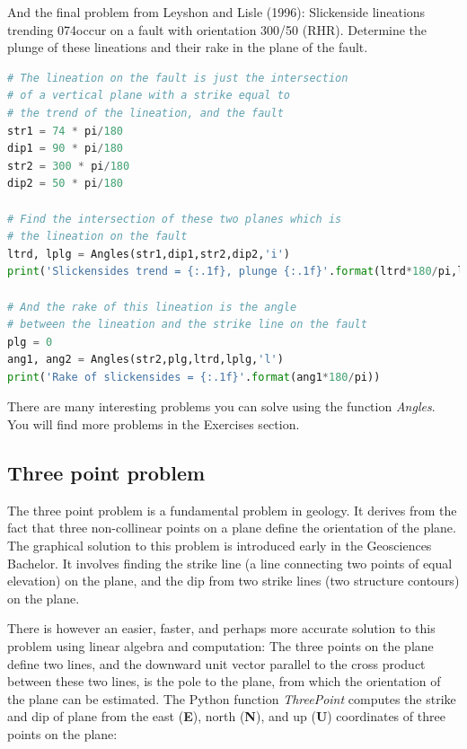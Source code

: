 \documentclass[a4paper , 12pt]{book}
\begin{document}
And the final problem from Leyshon and Lisle (1996): Slickenside lineations trending 074\degree occur on a fault with orientation 300/50 (RHR). Determine the plunge of these lineations and their rake in the plane of the fault.

\begin{center}
\begin{lstlisting}[language=Python, frame=single]
# The lineation on the fault is just the intersection
# of a vertical plane with a strike equal to
# the trend of the lineation, and the fault
str1 = 74 * pi/180
dip1 = 90 * pi/180
str2 = 300 * pi/180
dip2 = 50 * pi/180

# Find the intersection of these two planes which is
# the lineation on the fault
ltrd, lplg = Angles(str1,dip1,str2,dip2,'i')
print('Slickensides trend = {:.1f}, plunge {:.1f}'.format(ltrd*180/pi,lplg*180/pi))

# And the rake of this lineation is the angle
# between the lineation and the strike line on the fault
plg = 0
ang1, ang2 = Angles(str2,plg,ltrd,lplg,'l')
print('Rake of slickensides = {:.1f}'.format(ang1*180/pi))
\end{lstlisting}
\end{center}

There are many interesting problems you can solve using the function \textit{Angles}. You will find more problems in the Exercises section.

\subsection{Three point problem}

The three point problem is a fundamental problem in geology. It derives from the fact that three non-collinear points on a plane define the orientation of the plane. The graphical solution to this problem is introduced early in the Geosciences Bachelor. It involves finding the strike line (a line connecting two points of equal elevation) on the plane, and the dip from two strike lines (two structure contours) on the plane. 

There is however an easier, faster, and perhaps more accurate solution to this problem using linear algebra and computation: The three points on the plane define two lines, and the downward unit vector parallel to the cross product between these two lines, is the pole to the plane, from which the orientation of the plane can be estimated. The Python function \textit{ThreePoint} computes the strike and dip of plane from the east (\textbf{E}), north (\textbf{N}), and up (\textbf{U}) coordinates of three points on the plane:
\end{document}
